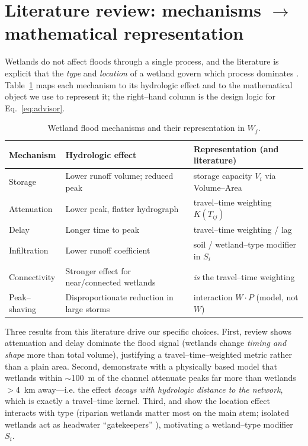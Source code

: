 \documentclass[11pt]{article}
\newcommand{\Wj}{W_{j}}
\newcommand{\Ti}{T_{ij}}
\begin{document}
\section{Literature review: mechanisms $\rightarrow$ mathematical representation}
Wetlands do not affect floods through a single process, and the literature is explicit that the
\emph{type} and \emph{location} of a wetland govern which process dominates
\citep{acreman2013,bullock2003}. Table~\ref{tab:mech} maps each mechanism to its hydrologic
effect and to the mathematical object we use to represent it; the right--hand column is the
design logic for Eq.~\eqref{eq:advisor}.

\begin{table}[htbp]\centering
\caption{Wetland flood mechanisms and their representation in $\Wj$.}
\label{tab:mech}
\small
\begin{tabular}{p{2.3cm}p{4.3cm}p{6.2cm}}
\toprule
Mechanism & Hydrologic effect & Representation (and literature) \\
\midrule
Storage & Lower runoff volume; reduced peak & storage capacity $V_i$ via Volume--Area
\citep{gleason2007,laneDamico2010,wu2016} \\
Attenuation & Lower peak, flatter hydrograph & travel--time weighting $K(\Ti)$ \citep{acreman2013} \\
Delay & Longer time to peak & travel--time weighting / lag \citep{mcmillan2020} \\
Infiltration & Lower runoff coefficient & soil / wetland--type modifier in $S_i$ \\
Connectivity & Stronger effect for near/connected wetlands & \emph{is} the travel--time weighting
\citep{lane2018,ameli2019} \\
Peak--shaving & Disproportionate reduction in large storms & interaction $W\!\cdot\!P$ (model, not $W$) \\
\bottomrule
\end{tabular}
\end{table}

Three results from this literature drive our specific choices. First, \citet{acreman2013} review
shows attenuation and delay dominate the flood signal (wetlands change \emph{timing and shape}
more than total volume), justifying a travel--time--weighted metric rather than a plain area.
Second, \citet{ameli2019} demonstrate with a physically based model that wetlands within
$\sim$100~m of the channel attenuate peaks far more than wetlands $>$4~km away---i.e. the effect
\emph{decays with hydrologic distance to the network}, which is exactly a travel--time kernel.
Third, \citet{fossey2016} and \citet{evenson2015} show the location effect interacts with type
(riparian wetlands matter most on the main stem; isolated wetlands act as headwater
``gatekeepers'' \citep{golden2016}), motivating a wetland--type modifier $S_i$.
\end{document}
